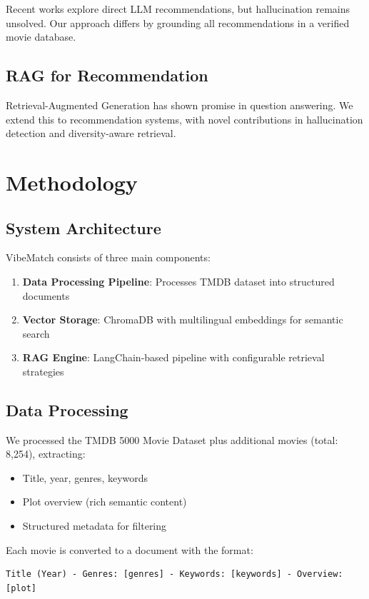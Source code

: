 \documentclass[11pt,a4paper]{article}
\begin{document}
Recent works explore direct LLM recommendations, but hallucination remains unsolved. Our approach differs by grounding all recommendations in a verified movie database.

\subsection{RAG for Recommendation}

Retrieval-Augmented Generation has shown promise in question answering. We extend this to recommendation systems, with novel contributions in hallucination detection and diversity-aware retrieval.

\section{Methodology}

\subsection{System Architecture}

VibeMatch consists of three main components:

\begin{enumerate}
    \item \textbf{Data Processing Pipeline}: Processes TMDB dataset into structured documents
    \item \textbf{Vector Storage}: ChromaDB with multilingual embeddings for semantic search
    \item \textbf{RAG Engine}: LangChain-based pipeline with configurable retrieval strategies
\end{enumerate}

\subsection{Data Processing}

We processed the TMDB 5000 Movie Dataset plus additional movies (total: 8,254), extracting:
\begin{itemize}
    \item Title, year, genres, keywords
    \item Plot overview (rich semantic content)
    \item Structured metadata for filtering
\end{itemize}

Each movie is converted to a document with the format:
\begin{verbatim}
Title (Year) - Genres: [genres] - Keywords: [keywords] - Overview: [plot]
\end{verbatim}
\end{document}
